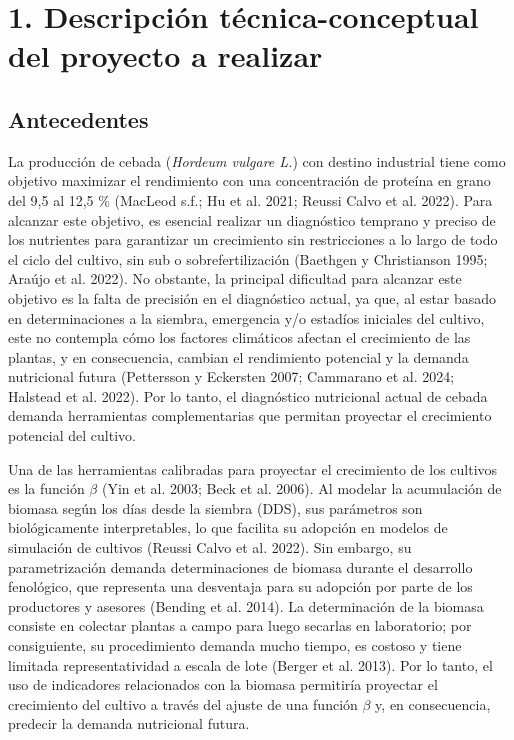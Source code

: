 \documentclass[
11pt, %
]{charter}
\begin{document}
\pagebreak



\section{1. Descripción técnica-conceptual del proyecto a realizar}
\label{sec:descripcion}

\subsection{Antecedentes}
\label{sec:descripcion}
La producción de cebada (\emph{Hordeum vulgare L.}) con destino industrial tiene como objetivo maximizar el rendimiento con una concentración de proteína en grano del 9{,}5 al 12{,}5 \% (MacLeod s.f.; Hu et al. 2021; Reussi Calvo et al. 2022). Para alcanzar este objetivo, es esencial realizar un diagnóstico temprano y preciso de los nutrientes para garantizar un crecimiento sin restricciones a lo largo de todo el ciclo del cultivo, sin sub o sobrefertilización (Baethgen y Christianson 1995; Araújo et al. 2022). No obstante, la principal dificultad para alcanzar este objetivo es la falta de precisión en el diagnóstico actual, ya que, al estar basado en determinaciones a la siembra, emergencia y/o estadíos iniciales del cultivo, este no contempla cómo los factores climáticos afectan el crecimiento de las plantas, y en consecuencia, cambian el rendimiento potencial y la demanda nutricional futura (Pettersson y Eckersten 2007; Cammarano et al. 2024; Halstead et al. 2022). Por lo tanto, el diagnóstico nutricional actual de cebada demanda herramientas complementarias que permitan proyectar el crecimiento potencial del cultivo.
 
Una de las herramientas calibradas para proyectar el crecimiento de los cultivos es la función $\beta$ (Yin et al. 2003; Beck et al. 2006). Al modelar la acumulación de biomasa según los días desde la siembra (DDS), sus parámetros son biológicamente interpretables, lo que facilita su adopción en modelos de simulación de cultivos (Reussi Calvo et al. 2022). Sin embargo, su parametrización demanda determinaciones de biomasa durante el desarrollo fenológico, que representa una desventaja para su adopción por parte de los productores y asesores (Bending et al. 2014). La determinación de la biomasa consiste en colectar plantas a campo para luego secarlas en laboratorio; por consiguiente, su procedimiento demanda mucho tiempo, es costoso y tiene limitada representatividad a escala de lote (Berger et al. 2013). Por lo tanto, el uso de indicadores relacionados con la biomasa permitiría proyectar el crecimiento del cultivo a través del ajuste de una función $\beta$ y, en consecuencia, predecir la demanda nutricional futura.
\end{document}
